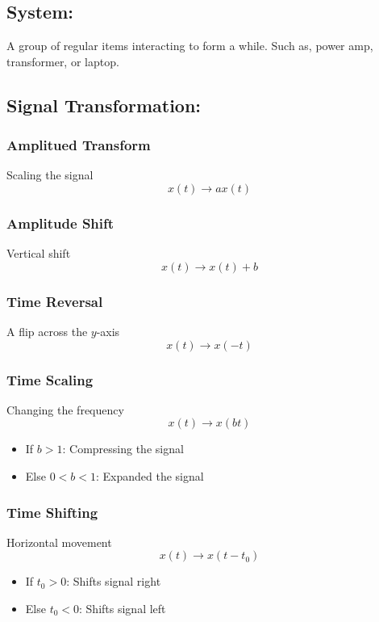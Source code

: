 \documentclass[a5paper]{article}
\begin{document}
	\subsection{System:}
	A group of regular items interacting to form a while. Such as, power amp, transformer, or laptop.
	\subsection{Signal Transformation:}
	\subsubsection{Amplitued Transform}
	Scaling the signal
	$$x(t)\rightarrow ax(t)$$
	\subsubsection{Amplitude Shift}
	Vertical shift
	$$x(t)\rightarrow x(t)+b$$
	\subsubsection{Time Reversal}
	A flip across the $y$-axis
	$$x(t)\rightarrow x(-t)$$
	\subsubsection{Time Scaling}
	Changing the frequency
	$$x(t)\rightarrow x(bt)$$
	\begin{itemize}
		\item If $b>1$: Compressing the signal
		\item Else $0<b<1$: Expanded the signal
	\end{itemize}
	\subsubsection{Time Shifting}
	Horizontal movement
	$$x(t)\rightarrow x(t-t_{0})$$
	\begin{itemize}
		\item If $t_{0}>0$: Shifts signal right
		\item Else $t_{0}<0$: Shifts signal left
	\end{itemize}
\end{document}
